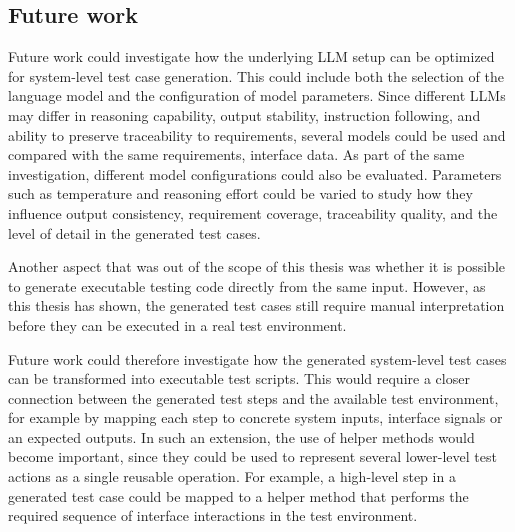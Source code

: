 \documentclass[a4paper,12pt]{article}
\begin{document}
\subsection{Future work}
Future work could investigate how the underlying LLM setup can be optimized for system-level test case generation. This could include both the selection of the language model and the configuration of model parameters. Since different LLMs may differ in reasoning capability, output stability, instruction following, and ability to preserve traceability to requirements, several models could be used and compared with the same requirements, interface data. As part of the same investigation, different model configurations could also be evaluated. Parameters such as temperature and reasoning effort could be varied to study how they influence output consistency, requirement coverage, traceability quality, and the level of detail in the generated test cases.

Another aspect that was out of the scope of this thesis was whether it is possible to generate executable testing code directly from the same input. However, as this thesis has shown, the generated test cases still require manual interpretation before they can be executed in a real test environment.

Future work could therefore investigate how the generated system-level test cases can be transformed into executable test scripts. This would require a closer connection between the generated test steps and the available test environment, for example by mapping each step to concrete system inputs, interface signals or an expected outputs. In such an extension, the use of helper methods would become important, since they could be used to represent several lower-level test actions as a single reusable operation. For example, a high-level step in a generated test case could be mapped to a helper method that performs the required sequence of interface interactions in the test environment.

\newpage


%
\newpage

\hypersetup{urlcolor=black}


\newpage

 
\end{document}

